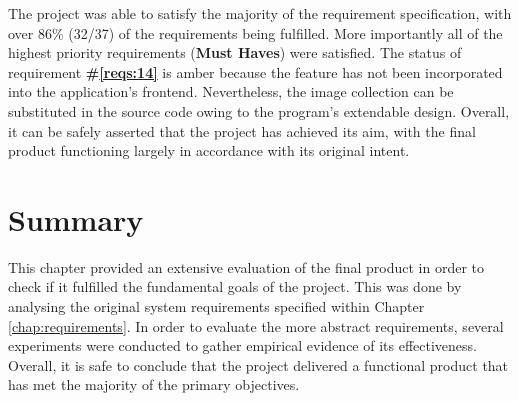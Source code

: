 \documentclass{l4proj}
\begin{document}
The project was able to satisfy the majority of the requirement specification, with over 86\% (32/37) of the requirements being fulfilled. More importantly all of the highest priority requirements (\textbf{Must Haves}) were satisfied. The status of requirement \textbf{\#\ref{reqs:14}} is amber because the feature has not been incorporated into the application's frontend. Nevertheless, the image collection can be substituted in the source code owing to the program's extendable design. Overall, it can be safely asserted that the project has achieved its aim, with the final product functioning largely in accordance with its original intent.


\section{Summary}
This chapter provided an extensive evaluation of the final product in order to check if it fulfilled the fundamental goals of the project. This was done by analysing the original system requirements specified within Chapter \ref{chap:requirements}. In order to evaluate the more abstract requirements, several experiments were conducted to gather empirical evidence of its effectiveness. Overall, it is safe to conclude that the project delivered a functional product that has met the majority of the primary objectives. 



\end{document}
